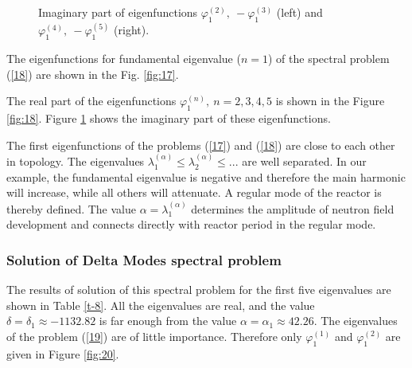 \documentclass[authoryear]{elsarticle}
\begin{document}
\begin{figure}[!h]
  \begin{center}
\begin{minipage}{0.49\linewidth}
 \\
\end{minipage}
\hfill
\begin{minipage}{0.49\linewidth}
 \\
\end{minipage}
\caption{Imaginary part of eigenfunctions $\varphi^{(2)}_1, \ - \varphi^{(3)}_1$ (left) and $\varphi^{(4)}_1, \ - \varphi^{(5)}_1$ (right).}
\label{fig:19}
  \end{center}
\end{figure}

The eigenfunctions for fundamental eigenvalue ($n=1$) of the spectral problem (\ref{18}) are shown in the Fig. \ref{fig:17}.

The real part of the eigenfunctions $\varphi^{(n)}_1, \ n = 2,3,4,5$ is shown in the Figure \ref{fig:18}.
Figure \ref{fig:19} shows the imaginary part of these eigenfunctions.

The first eigenfunctions of the problems (\ref{17}) and (\ref{18}) are close to each other in topology.
The eigenvalues $\lambda_1^{(\alpha)} \leq  \lambda_2^{(\alpha)} \leq ...$
are well separated. In our example, the fundamental eigenvalue is negative and therefore the main harmonic will increase, while all others will attenuate. A regular mode of the reactor is thereby defined. The value $\alpha = \lambda_1^{(\alpha)}$ determines the amplitude of neutron field development and connects directly with reactor period in the regular mode.

\pagebreak
\subsubsection{Solution of Delta  Modes spectral problem} 
The results of solution of this spectral problem for the first five eigenvalues are shown in Table \ref{t-8}. All the eigenvalues are real, and the value $\delta = \delta_1 \approx -1132.82$ is far enough from the value $\alpha  = \alpha_1 \approx 42.26$.
The eigenvalues of the problem (\ref{19}) are of little importance. Therefore only $\varphi^{(1)}_1$ and $\varphi^{(2)}_1$ are given in Figure \ref{fig:20}.
\end{document}
